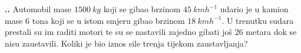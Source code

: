 
\noindent 
\textbf{
\thecjelina.\thezadatak.}
Automobil mase $1500\ kg$ koji se gibao brzinom $45\ kmh^{-1}$ udario je u kamion mase 6 tona koji se u istom smjeru gibao 
brzinom $18 \ kmh^{-1}$. U trenutku sudara prestali su im raditi motori te su se nastavili zajedno gibati još 26 metara dok se nisu zaustavili. Koliki je bio iznos sile trenja tijekom zaustavljanja?
